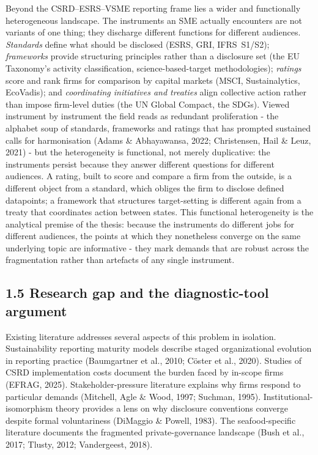 \documentclass[
]{article}
\newcounter{none} %
\begin{document}
Beyond the CSRD--ESRS--VSME reporting frame lies a wider and functionally
heterogeneous landscape. The instruments an SME actually encounters are
not variants of one thing; they discharge different functions for
different audiences. \emph{Standards} define what should be disclosed
(ESRS, GRI, IFRS~S1/S2); \emph{frameworks} provide structuring principles
rather than a disclosure set (the EU Taxonomy's activity classification,
science-based-target methodologies); \emph{ratings} score and rank firms
for comparison by capital markets (MSCI, Sustainalytics, EcoVadis); and
\emph{coordinating initiatives and treaties} align collective action
rather than impose firm-level duties (the UN Global Compact, the SDGs).
Viewed instrument by instrument the field reads as redundant proliferation - the \textquotesingle alphabet soup\textquotesingle{} of standards,
frameworks and ratings that has prompted sustained calls for harmonisation
(Adams \& Abhayawansa, 2022; Christensen, Hail \& Leuz, 2021) - but the
heterogeneity is functional, not merely duplicative: the instruments
persist because they answer different questions for different audiences. A
rating, built to score and compare a firm from the outside, is a different
object from a standard, which obliges the firm to disclose defined
datapoints; a framework that structures target-setting is different again
from a treaty that coordinates action between states. This functional
heterogeneity is the analytical
premise of the thesis: because the instruments do different jobs for
different audiences, the points at which they nonetheless converge on the
same underlying topic are informative - they mark demands that are
robust across the fragmentation rather than artefacts of any single
instrument.

\subsection{1.5 Research gap and the diagnostic-tool
argument}\label{research-gap-and-the-diagnostic-tool-argument}

Existing literature addresses several aspects of this problem in
isolation. Sustainability reporting maturity models describe staged
organizational evolution in reporting practice (Baumgartner et al.,
2010; Cöster et al., 2020). Studies of CSRD implementation costs
document the burden faced by in-scope firms (EFRAG, 2025).
Stakeholder-pressure literature explains why firms respond to particular
demands (Mitchell, Agle \& Wood, 1997; Suchman, 1995).
Institutional-isomorphism theory provides a lens on why disclosure
conventions converge despite formal voluntariness (DiMaggio \& Powell,
1983). The seafood-specific literature documents the fragmented
private-governance landscape (Bush et al., 2017; Tlusty, 2012;
Vandergeest, 2018).
\end{document}
